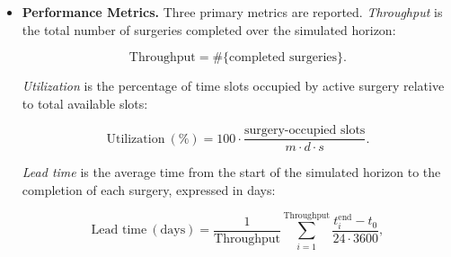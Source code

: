 \documentclass[sn-mathphys-num]{sn-jnl}
\begin{document}
\begin{itemize}
  \begin{algorithm}[H]
  \caption{Central Scheduler (high-level view)}
  \label{alg:scheduler}
  \begin{algorithmic}[1]
  \State Initialize schedule $Q[m,d,s] \gets \emptyset$ and
  $next\_free[q] \gets 0$
  \State Generate urgent event list $E$ with arrival times (NHPP)
  \State Sort elective queue according to selected rule (FIFO/SPT/LPT)
    \State $t \gets 0$
      \State Release into urgent queue all cases with arrival $\leq$
      current time
      \State $OR\_free \gets \{q : next\_free[q] \leq t\}$
        \State $t \gets \min_q next\_free[q]$
        \State \textbf{continue}
      \EndIf
        \State Determine eligibility based on time window and
        exclusivity/reservation policy
        \State Select care type: urgent if pending urgent demand
        exists; elective otherwise
        \State Attempt to assign surgery $+$ cleaning in
        $Q[q, day, \cdot]$ from $t$
          \State Update $next\_free[q]$, metrics, and queues
        \EndIf
      \EndFor
      \State Advance $t$ to next relevant event
    \EndWhile
  \EndFor
  \end{algorithmic}
  \end{algorithm}

  \item \textbf{Performance Metrics.}
  Three primary metrics are reported. \textit{Throughput} is the total
  number of surgeries completed over the simulated horizon:

  \begin{equation}
  \text{Throughput} = \#\{\text{completed surgeries}\}.
  \end{equation}

  \textit{Utilization} is the percentage of time slots occupied by
  active surgery relative to total available slots:

  \begin{equation}
  \text{Utilization}~(\%) = 100 \cdot
  \frac{\text{surgery-occupied slots}}{m \cdot d \cdot s}.
  \end{equation}

  \textit{Lead time} is the average time from the start of the simulated
  horizon to the completion of each surgery, expressed in days:

  \begin{equation}
  \text{Lead time}~(\text{days}) = \frac{1}{\text{Throughput}}
  \sum_{i=1}^{\text{Throughput}}
  \frac{t_i^{\text{end}} - t_0}{24 \cdot 3600},
  \end{equation}


\end{itemize}
\end{document}
